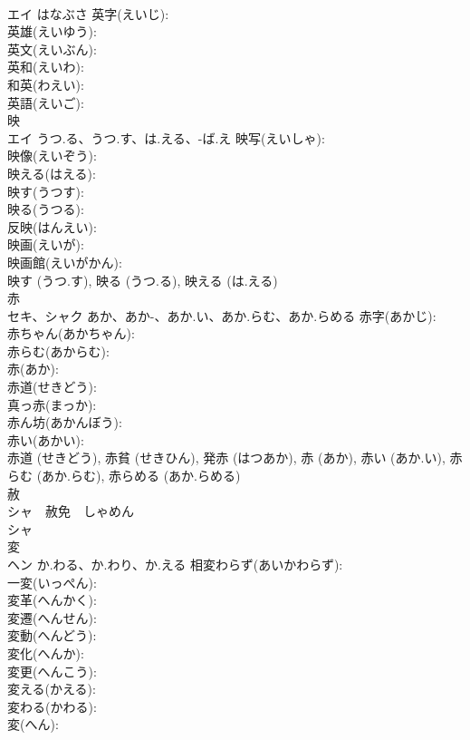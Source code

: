 \documentclass[8pt]{extreport}
\begin{document}
\begin{CJK}{UTF8}{min}
\\	エイ	はなぶさ	英字(えいじ): 
\\	英雄(えいゆう): 
\\	英文(えいぶん): 
\\	英和(えいわ): 
\\	和英(わえい): 
\\	英語(えいご): 
\\	映			
\\	エイ	うつ.る、うつ.す、は.える、-ば.え	映写(えいしゃ): 
\\	映像(えいぞう): 
\\	映える(はえる): 
\\	映す(うつす): 
\\	映る(うつる): 
\\	反映(はんえい): 
\\	映画(えいが): 
\\	映画館(えいがかん): 
\\	映す (うつ.す), 映る (うつ.る), 映える (は.える)
\\	赤			
\\	セキ、シャク	あか、あか-、あか.い、あか.らむ、あか.らめる	赤字(あかじ): 
\\	赤ちゃん(あかちゃん): 
\\	赤らむ(あからむ): 
\\	赤(あか): 
\\	赤道(せきどう): 
\\	真っ赤(まっか): 
\\	赤ん坊(あかんぼう): 
\\	赤い(あかい): 
\\	赤道 (せきどう), 赤貧 (せきひん), 発赤 (はつあか), 赤 (あか), 赤い (あか.い), 赤らむ (あか.らむ), 赤らめる (あか.らめる)
\\	赦			
\\	シャ　赦免　しゃめん
\\	シャ			
\\	変			
\\	ヘン	か.わる、か.わり、か.える	相変わらず(あいかわらず): 
\\	一変(いっぺん): 
\\	変革(へんかく): 
\\	変遷(へんせん): 
\\	変動(へんどう): 
\\	変化(へんか): 
\\	変更(へんこう): 
\\	変える(かえる): 
\\	変わる(かわる): 
\\	変(へん): 

\end{CJK}
\end{document}
